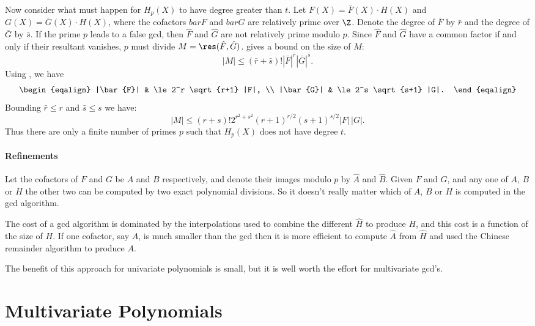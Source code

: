 \smallskip
Now consider what must happen for $H_p(X)$ to have degree greater than
$t$.  Let $F(X) = \bar{F}(X) \cdot H(X)$ and $G(X) = \bar{G}(X) \cdot
H(X)$, where the cofactors $bar{F}$ and $bar{G}$ are relatively prime
over $\Z$.  Denote the degree of $\bar{F}$ by $\bar{r}$ and the degree
of $\bar{G}$ by $\bar{s}$.  If the prime $p$ leads to a false {\sc gcd},
then $\hat{F}$ and $\hat{G}$ are not relatively prime modulo $p$.
Since $\hat{F}$ and $\hat{G}$ have a common factor if and only if
their resultant vanishes, $p$ must divide $M = \res (\hat{F},
\hat{G})$.   gives a bound on the
size of $M$: 
\[
|M| \le (\bar{r} + \bar{s})! |\bar{F}|^{\bar{r}} |\bar{G}|^{\bar{s}}.
\]
Using , we have
\[
\begin{eqalign}
|\bar{F}| & \le 2^r \sqrt{r+1} |F|, \\
|\bar{G}| & \le 2^s \sqrt{s+1} |G|.
\end{eqalign}
\]
Bounding $\bar{r} \le r$ and $\bar{s} \le s$ we have:
\[
|M| \le (r+s)! 2^{r^2+s^2} (r+1)^{r/2} (s+1)^{s/2} |F| \, |G|.
\]
Thus there are only a finite number of primes $p$ such that $H_p(X)$
does not have degree $t$.

\paragraph{Refinements}

Let the cofactors of $F$ and $G$ be $A$ and $B$ respectively, and
denote their images modulo $p$ by $\hat{A}$ and $\hat{B}$.  Given $F$
and $G$, and any one of $A$, $B$ or $H$ the other two can be computed
by two exact polynomial divisions.  So it doesn't really matter which
of $A$, $B$ or $H$ is computed in the {\sc gcd} algorithm.  

The cost of a {\sc gcd} algorithm is dominated by the interpolations used to
combine the different $\hat{H}$ to produce $H$, and this cost is a
function of the size of $H$.  If one cofactor, say $A$, is much
smaller than the {\sc gcd} then it is more efficient to compute $\hat{A}$
from $\hat{H}$ and used the Chinese remainder algorithm  to produce
$A$.  

The benefit of this approach for univariate polynomials is small, but
it is well worth the effort for multivariate {\sc gcd}'s.

\section{Multivariate Polynomials}
\label{PGCD:Multi:Sec}

